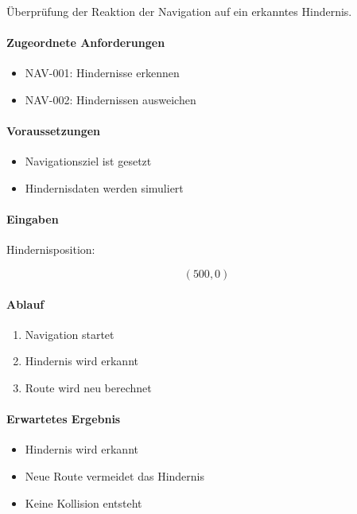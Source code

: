 Überprüfung der Reaktion der Navigation auf ein erkanntes Hindernis.

\paragraph{Zugeordnete Anforderungen}\label{zugeordnete-anforderungen-3}

\begin{itemize}
\tightlist
\item
  NAV-001: Hindernisse erkennen
\item
  NAV-002: Hindernissen ausweichen
\end{itemize}

\paragraph{Voraussetzungen}\label{voraussetzungen-3}

\begin{itemize}
\tightlist
\item
  Navigationsziel ist gesetzt
\item
  Hindernisdaten werden simuliert
\end{itemize}

\paragraph{Eingaben}\label{eingaben-3}

Hindernisposition:

\[
(500,0)
\]

\paragraph{Ablauf}\label{ablauf-3}

\begin{enumerate}
\def\labelenumi{\arabic{enumi}.}
\tightlist
\item
  Navigation startet
\item
  Hindernis wird erkannt
\item
  Route wird neu berechnet
\end{enumerate}

\paragraph{Erwartetes Ergebnis}\label{erwartetes-ergebnis-3}

\begin{itemize}
\tightlist
\item
  Hindernis wird erkannt
\item
  Neue Route vermeidet das Hindernis
\item
  Keine Kollision entsteht
\end{itemize}

